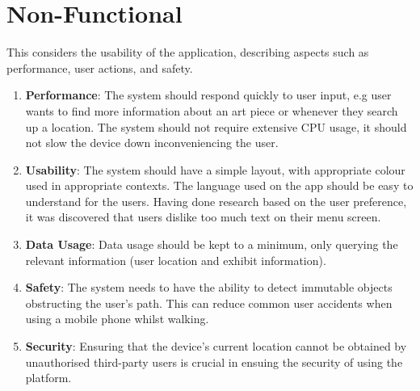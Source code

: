 \section{Non-Functional}
This considers the usability of the application, describing aspects such as performance, user actions, and safety.
\begin{enumerate}
	\item \textbf{Performance}: The system should respond quickly to user input, e.g user wants to find more information about an art piece or whenever they search up a location. The system should not require extensive CPU usage, it should not slow the device down inconveniencing the user.

	\item \textbf{Usability}: The system should have a simple layout, with appropriate colour used in appropriate contexts. The language used on the app should be easy to understand for the users. Having done research based on the user preference, it was discovered that users dislike too much text on their menu screen.

	\item \textbf{Data Usage}: Data usage should be kept to a minimum, only querying the relevant information (user location and exhibit information).

	\item \textbf{Safety}: The system needs to have the ability to detect immutable objects obstructing the user’s path. This can reduce common user accidents when using a mobile phone whilst walking.
	
	\item \textbf{Security}: Ensuring that the device’s current location cannot be obtained by unauthorised third-party users is crucial in ensuing the security of using the platform.
\end{enumerate}
